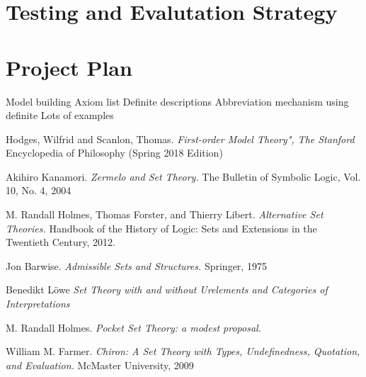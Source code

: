 \documentclass[12pt]{article}
\theoremstyle{definition}
\begin{document}
\section{Testing and Evalutation Strategy}

\section{Project Plan}
Model building
Axiom list
Definite descriptions
Abbreviation mechanism using definite
Lots of examples

\begin{thebibliography}{9}
Hodges, Wilfrid and Scanlon, Thomas.
\textit{First-order Model Theory", The Stanford} Encyclopedia of Philosophy (Spring 2018 Edition)

Akihiro Kanamori.
\textit{Zermelo and Set Theory.}
The Bulletin of Symbolic Logic, Vol. 10, No. 4, 2004

M. Randall Holmes, Thomas Forster, and Thierry Libert.
\textit{Alternative Set Theories.}
Handbook of the History of Logic: Sets and Extensions in the Twentieth Century, 2012.

Jon Barwise.
\textit{Admissible Sets and Structures.}
Springer, 1975

Benedikt L\"owe
\textit{Set Theory with and without Urelements and Categories of Interpretations}

M. Randall Holmes.
\textit{Pocket Set Theory: a modest proposal.}

William M. Farmer.
\textit{Chiron: A Set Theory with Types,
Undefinedness, Quotation, and Evaluation.}
McMaster University, 2009

\end{thebibliography}
\end{document}
